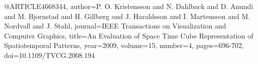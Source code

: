 @ARTICLE{4668344,
  author={P. O. {Kristensson} and N. {Dahlback} and D. {Anundi} and M. {Bjornstad} and H. {Gillberg} and J. {Haraldsson} and I. {Martensson} and M. {Nordvall} and J. {Stahl}},
  journal={IEEE Transactions on Visualization and Computer Graphics}, 
  title={An Evaluation of Space Time Cube Representation of Spatiotemporal Patterns}, 
  year={2009},
  volume={15},
  number={4},
  pages={696-702},
  doi={10.1109/TVCG.2008.194}}